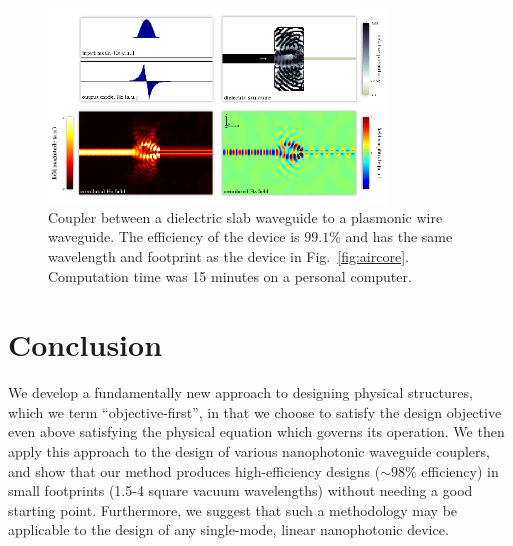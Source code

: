 \documentclass[letterpaper,10pt]{article}
\begin{document}
\begin{figure}[htb]
    \centering
    \includegraphics[width=0.8\textwidth]{5}
    \caption{Coupler between a dielectric slab waveguide to 
            a plasmonic wire waveguide.
        The efficiency of the device is $99.1\%$ and 
            has the same wavelength and footprint as the device in
            Fig.~\ref{fig:aircore}.
        Computation time was 15 minutes on a personal computer.
        }
        \label{fig:wire}
\end{figure}

\section{Conclusion}
We develop a fundamentally new approach to designing physical structures,
    which we term ``objective-first'', 
    in that we choose to satisfy the design objective 
    even above satisfying the physical equation which governs its operation.
We then apply this approach to the design of 
    various nanophotonic waveguide couplers,
    and show that our method produces
    high-efficiency designs ($\sim 98\%$ efficiency) 
    in small footprints (1.5-4 square vacuum wavelengths)
    without needing a good starting point.
Furthermore, we suggest that such a methodology may be applicable
    to the design of any single-mode, linear nanophotonic device.\\
\end{document}
